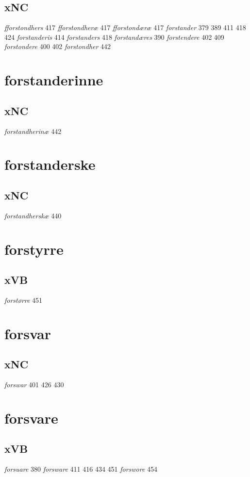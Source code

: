 \documentclass[a4paper,twocolumn]{article}
\begin{document}
\subsection{xNC}
\label{sec:org9db81f4}
\emph{fforstondhers} 417 \emph{fforstondheræ} 417 \emph{fforstondæræ} 417 \emph{forstander} 379 389 411 418 424 \emph{forstanderis} 414 \emph{forstanders} 418 \emph{forstandæres} 390 \emph{forstendere} 402 409 \emph{forstondere} 400 402 \emph{forstondher} 442 
\section{forstanderinne}
\label{sec:orgdbd63e6}
\subsection{xNC}
\label{sec:org09e4a10}
\emph{forstandherinæ} 442 
\section{forstanderske}
\label{sec:orge7c81b1}
\subsection{xNC}
\label{sec:org5e8c66b}
\emph{forstandherskæ} 440 
\section{forstyrre}
\label{sec:orgc83f99f}
\subsection{xVB}
\label{sec:org3467d11}
\emph{forstørre} 451 
\section{forsvar}
\label{sec:org52c4583}
\subsection{xNC}
\label{sec:orgeef65d8}
\emph{forswar} 401 426 430 
\section{forsvare}
\label{sec:org4226cdd}
\subsection{xVB}
\label{sec:orgd77de37}
\emph{forsuare} 380 \emph{forsware} 411 416 434 451 \emph{forswore} 454 
\end{document}
